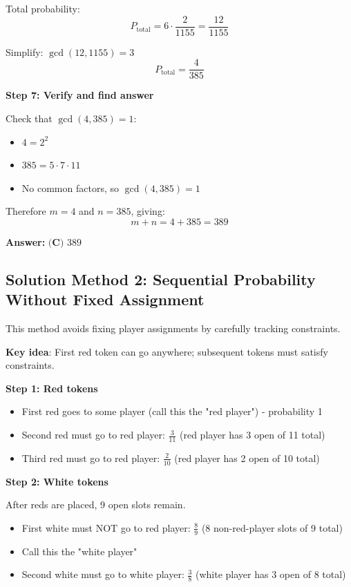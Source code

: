 \documentclass[12pt]{article}
\begin{document}
Total probability:
\[P_{\text{total}} = 6 \cdot \frac{2}{1155} = \frac{12}{1155}\]

Simplify: $\gcd(12, 1155) = 3$
\[P_{\text{total}} = \frac{4}{385}\]

\textbf{Step 7: Verify and find answer}

Check that $\gcd(4, 385) = 1$:
\begin{itemize}
    \item $4 = 2^2$
    \item $385 = 5 \cdot 7 \cdot 11$
    \item No common factors, so $\gcd(4, 385) = 1$ \checkmark
\end{itemize}

Therefore $m = 4$ and $n = 385$, giving:
\[m + n = 4 + 385 = 389\]

\textbf{Answer: } $\boxed{\textbf{(C) } 389}$

\subsection*{Solution Method 2: Sequential Probability Without Fixed Assignment}

This method avoids fixing player assignments by carefully tracking constraints.

\textbf{Key idea}: First red token can go anywhere; subsequent tokens must satisfy constraints.

\textbf{Step 1: Red tokens}

\begin{itemize}
    \item First red goes to some player (call this the "red player") - probability 1
    \item Second red must go to red player: $\frac{3}{11}$ (red player has 3 open of 11 total)
    \item Third red must go to red player: $\frac{2}{10}$ (red player has 2 open of 10 total)
\end{itemize}

\textbf{Step 2: White tokens}

After reds are placed, 9 open slots remain.

\begin{itemize}
    \item First white must NOT go to red player: $\frac{8}{9}$ (8 non-red-player slots of 9 total)
    \item Call this the "white player"
    \item Second white must go to white player: $\frac{3}{8}$ (white player has 3 open of 8 total)
\end{itemize}
\end{document}
